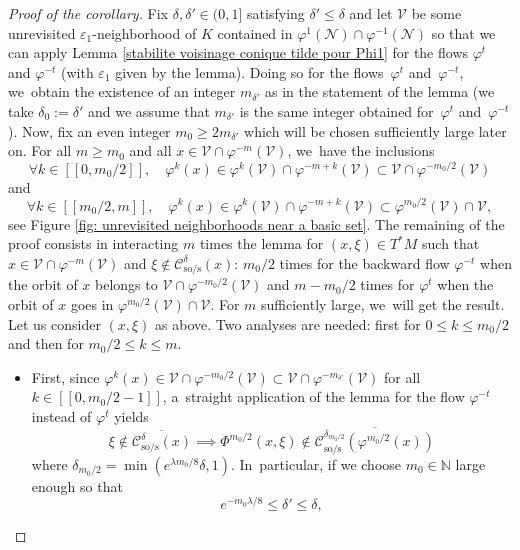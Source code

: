 \documentclass[JEP,XML,SOM,Unicode,NoEqCountersInSection,NoFloatCountersInSection,published]{cedram}
\newcommand{\lcr}{[\![}
\newcommand{\rcr}{]\!]}
\newcommand{\rs}{\mathrm{s}}
\newcommand{\rso}{\mathrm{so}}
\theoremstyle{definition}
\theoremstyle{plain}
\newcommand{\Ccal}{\mathcal{C}}
\newcommand{\Ncal}{\mathcal{N}}
\newcommand{\N}{\mathbb{N}}
\newcommand{\Vcal}{\mathcal{V}}
\begin{document}
\begin{proof}[Proof of the corollary]
Fix $\delta,\delta'\in(0,1]$ satisfying $\delta' \leq \delta$ and let $\Vcal$ be some unrevisited $\varepsilon_1$\nobreakdash-neighborhood of $K$ contained in $\varphi^1(\Ncal) \cap \varphi^{-1} (\Ncal)$ so that we can apply Lemma \ref{stabilite voisinage conique tilde pour Phi1} for the flows $\varphi^t$ and $\varphi^{-t}$ (with $\varepsilon_1$ given by the lemma). Doing so for the flows~$\varphi^t$ and~$\varphi^{-t}$, we~obtain the existence of an integer $m_{\delta'}$ as in the statement of the lemma (we take $\delta_0:= \delta'$ and we assume that $m_{\delta'}$ is the same integer obtained for~$\varphi^t$ and~$\varphi^{-t}$). Now, fix an even integer $m_0 \geq 2m_{\delta'}$ which will be chosen sufficiently large later on. For all $m \geq m_{0}$ and all $x \in \Vcal \cap \varphi^{-m} (\Vcal)$, we~have the inclusions
\[
\forall k \in \lcr 0, m_0 /2 \rcr, \quad \varphi^{k} (x) \in \varphi^k (\Vcal) \cap \varphi^{-m + k} (\Vcal) \subset \Vcal \cap \varphi^{- m_{0}/2} (\Vcal)
\]
and
\[
\forall k \in \lcr m_0/2, m \rcr, \quad \varphi^{k} (x) \in \varphi^k (\Vcal) \cap \varphi^{-m + k} (\Vcal) \subset \varphi^{m_{0}/2} (\Vcal) \cap \Vcal,
\]
see Figure \ref{fig: unrevisited neighborhoods near a basic set}. The remaining of the proof consists in interacting $m$ times the lemma for $(x,\xi) \in T^* M$ such that $x \in \Vcal \cap \varphi^{-m} (\Vcal)$ and $\xi \notin \Ccal_{\rso/\rs}^{\delta} (x)$: $m_0/2$ times for the backward flow $\varphi^{-t}$ when the orbit of $x$ belongs to $\Vcal \cap \varphi^{- m_0/2} (\Vcal)$ and $m - m_0/2$ times for $\varphi^t$ when the orbit of $x$ goes in $ \varphi^{m_{0}/2} (\Vcal) \cap \Vcal$. For $m$ sufficiently large, we~will get the result. Let us consider $(x,\xi)$ as above. Two analyses are needed: first for $0 \leq k \leq m_0/2$ and then for $m_0/2 \leq k \leq m$.
\begin{itemize}
\item First, since $\varphi^k (x) \in \Vcal \cap \varphi^{- m_{0}/2} (\Vcal) \subset \Vcal \cap \varphi^{- m_{\delta'}} (\Vcal)$ for all $k \in \lcr 0, m_0 /2-1 \rcr$, a~straight application of the lemma for the flow $\varphi^{-t}$ instead of $\varphi^t$ yields
\[
\xi \notin \overline{\Ccal_{\rso/\rs}^{\delta} (x)} \implies \Phi^{m_0/2} (x,\xi) \notin \overline{\Ccal_{\rso/\rs}^{\delta_{m_0/2}} (\varphi^{m_0/2}(x))}
\]
where $\delta_{m_0/2} = \min (e^{\lambda m_0 /8} \delta, 1)$. In~particular, if we choose $m_0 \in \N$ large enough so that
\[
e^{-m_0 \lambda /8} \leq \delta' \leq \delta,
\]
\end{itemize}
\end{proof}
\end{document}
